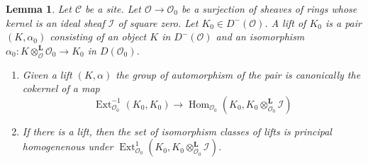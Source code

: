 \documentclass{stacks-project}
\theoremstyle{plain}
\newtheorem{lemma}[subsection]{Lemma}
\theoremstyle{definition}
\theoremstyle{remark}
\numberwithin{equation}{subsection}
\def\Hom{\mathop{\mathrm{Hom}}\nolimits}
\def\Ext{\mathop{\mathrm{Ext}}\nolimits}
\begin{document}
\begin{lemma}
\label{lemma-first-order-defos-complex}
Let $\mathcal{C}$ be a site. Let $\mathcal{O} \to \mathcal{O}_0$
be a surjection of sheaves of rings whose kernel is an ideal sheaf
$\mathcal{I}$ of square zero. Let $K_0 \in D^-(\mathcal{O})$.
A lift of $K_0$ is a pair $(K, \alpha_0)$ consisting of an object
$K$ in $D^-(\mathcal{O})$ and an isomorphism
$\alpha_0 : K \otimes_\mathcal{O}^\mathbf{L} \mathcal{O}_0 \to K_0$
in $D(\mathcal{O}_0)$.
\begin{enumerate}
\item Given a lift $(K, \alpha)$ the group of automorphism of the pair
is canonically the cokernel of a map
$$
\Ext^{-1}_{\mathcal{O}_0}(K_0, K_0)
\longrightarrow
\Hom_{\mathcal{O}_0}(K_0, K_0 \otimes_{\mathcal{O}_0}^\mathbf{L} \mathcal{I})
$$
\item If there is a lift, then the set of isomorphism classes of lifts
is principal homogenenous under
$\Ext^1_{\mathcal{O}_0}(K_0,
K_0 \otimes_{\mathcal{O}_0}^\mathbf{L} \mathcal{I})$.
\end{enumerate}
\end{lemma}
\end{document}
